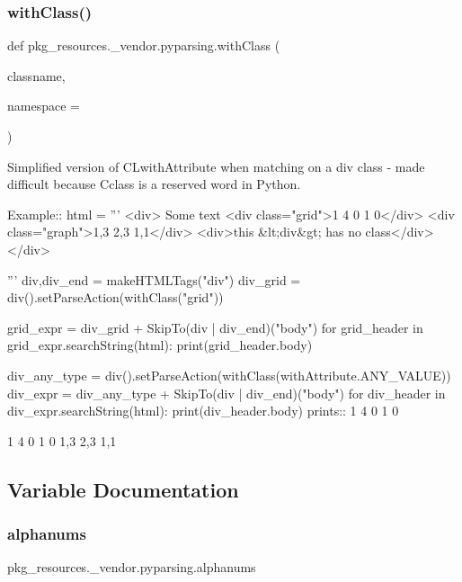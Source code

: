 \subsubsection{\texorpdfstring{with\+Class()}{withClass()}}
{\footnotesize\ttfamily def pkg\+\_\+resources.\+\_\+vendor.\+pyparsing.\+with\+Class (\begin{DoxyParamCaption}\item[{}]{classname,  }\item[{}]{namespace = {\ttfamily \textquotesingle{}\textquotesingle{}} }\end{DoxyParamCaption})}

\begin{DoxyVerb}Simplified version of C{L{withAttribute}} when matching on a div class - made
difficult because C{class} is a reserved word in Python.

Example::
    html = '''
        <div>
        Some text
        <div class="grid">1 4 0 1 0</div>
        <div class="graph">1,3 2,3 1,1</div>
        <div>this &lt;div&gt; has no class</div>
        </div>
            
    '''
    div,div_end = makeHTMLTags("div")
    div_grid = div().setParseAction(withClass("grid"))
    
    grid_expr = div_grid + SkipTo(div | div_end)("body")
    for grid_header in grid_expr.searchString(html):
        print(grid_header.body)
    
    div_any_type = div().setParseAction(withClass(withAttribute.ANY_VALUE))
    div_expr = div_any_type + SkipTo(div | div_end)("body")
    for div_header in div_expr.searchString(html):
        print(div_header.body)
prints::
    1 4 0 1 0

    1 4 0 1 0
    1,3 2,3 1,1
\end{DoxyVerb}
 

\subsection{Variable Documentation}
\mbox{\label{namespacepkg__resources_1_1__vendor_1_1pyparsing_aaefa867bd8a3629bb52efac6d2f1aad2}} 
\subsubsection{\texorpdfstring{alphanums}{alphanums}}
{\footnotesize\ttfamily pkg\+\_\+resources.\+\_\+vendor.\+pyparsing.\+alphanums}

